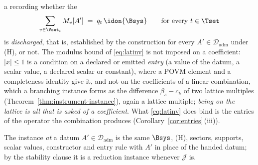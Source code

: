 \begin{definition}
\begin{enumerate}[label=(I\arabic*),leftmargin=3.0em]
  a
  recording whether the 
  \begin{equation}\label{eq:instance-classmarginal}
    \sum_{v\in\Vset_t}M_v[A']\;=\;q_t\,\idon{\Bsys}
    \qquad\text{for every }t\in\Tset
  \end{equation}
  is \emph{discharged}, that is, established by the construction for every
  $A'\in\mathcal{D}_{\mathrm{adm}}$ under (H), or not.
  The modulus bound of \eqref{eq:latinv} is not imposed on a coefficient:
  $|x|\le1$ is a condition on a declared or emitted \emph{entry} (a value of
  the datum, a scalar value, a declared scalar or constant), where a POVM
  element and a completeness identity give it, and not on the coefficients
  of a linear combination, which a branching instance forms as the
  difference $\beta_s-c_k$ of two lattice multiples
  (Theorem~\ref{thm:instrument-instance}), again a lattice multiple;
  \emph{being on the lattice is all that is asked of a coefficient}. What
  \eqref{eq:latinv} does bind is the entries of the operator the combination
  produces (Corollary~\ref{cor:entries}\,(iii)).
\end{enumerate}
The instance \emph{at} a datum $A'\in\mathcal{D}_{\mathrm{adm}}$ is the same
$\Bsys$, (H), sectors, supports, scalar values, constructor and entry rule
with $A'$ in place of the handed datum; by the stability clause it is a
reduction instance whenever $\mathcal{J}$ is.


\end{definition}
